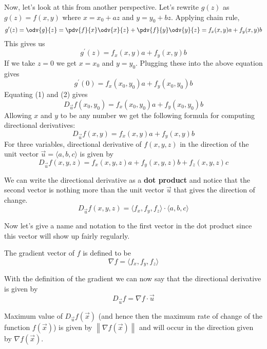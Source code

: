 Now, let's look at this from another perspective. Let's rewrite $g(z)$ as $g(z) = f(x,y)$ where $x=x_0+az$ and $y=y_0+bz$. Applying chain rule,
\[ g^\prime(z) = \odv{g}{z} = \pdv{f}{x}\odv{x}{z} + \pdv{f}{y}\odv{y}{z} = f_x (x,y)a + f_y (x,y)b \]
This gives us
\[ g^\prime(z) = f_x (x,y)a + f_y (x,y)b \]
If we take $z=0$ we get $x=x_0$ and $y=y_0$. Plugging these into the above equation gives
\begin{equation}\tag{2}
g^\prime(0) = f_x (x_0,y_0)a + f_y (x_0,y_0)b
\end{equation}
Equating (1) and (2) gives
\[ {D_{\vec u}}f(x_0,y_0) = f_x(x_0,y_0)a + f_y(x_0,y_0)b \]
Allowing $x$ and $y$ to be any number we get the following formula for computing directional derivatives:
\[ {D_{\vec u}}f(x,y) = f_x(x,y)a + f_y(x,y)b \]
For three variables, directional derivative of $f(x,y,z)$ in the direction of the unit vector $\vec{u}=\langle{a,b,c}\rangle$ is given by
\begin{equation}
{D_{\vec u}}f(x,y,z) = f_x (x,y,z)a + f_y (x,y,z)b + f_z (x,y,z)c
\end{equation}

We can write the directional derivative as a \textbf{dot product} and notice that the second vector is nothing more than the unit vector $\vec u$ that gives the direction of change.
\begin{equation}
{D_{\vec u}} f(x,y,z) = \langle {f_x,f_y,f_z} \rangle \cdot \langle {a,b,c} \rangle
\end{equation}

Now let's give a name and notation to the first vector in the dot product since this vector will show up fairly regularly.
\begin{definition}
The gradient vector of $f$ is defined to be
\begin{equation}
\nabla f = \langle f_x,f_y,f_z \rangle
\end{equation}
\end{definition}

With the definition of the gradient we can now say that the directional derivative is given by
\[ {D_{\vec u}}f = \nabla f\cdot \vec u \]

\begin{theorem}
Maximum value of $D_{\vec u} f(\vec{x})$ (and hence then the maximum rate of change of the function $f(\vec{x})$) is given by $\left\|\nabla f(\vec{x})\right\|$ and will occur in the direction given by $\nabla f(\vec{x})$.
\end{theorem}

